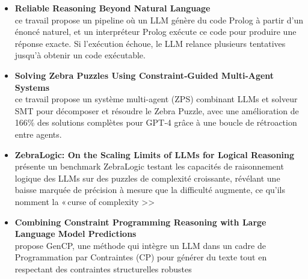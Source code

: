 \documentclass[a4paper,11pt]{article}
\begin{document}
\begin{itemize}
  \item \textbf{Reliable Reasoning Beyond Natural Language} \\
 ce travail propose un pipeline où un LLM génère du code Prolog à partir d’un énoncé naturel, et un interpréteur Prolog exécute ce code pour produire une réponse exacte. Si l’exécution échoue, le LLM relance plusieurs tentatives jusqu’à obtenir un code exécutable.

  \item \textbf{Solving Zebra Puzzles Using Constraint‑Guided Multi‑Agent Systems} \\
  ce travail propose un système multi-agent (ZPS) combinant LLMs et solveur SMT pour décomposer et résoudre le Zebra Puzzle, avec une amélioration de 166\% des solutions complètes pour GPT‑4 grâce à une boucle de rétroaction entre agents.

  \item \textbf{ZebraLogic: On the Scaling Limits of LLMs for Logical Reasoning} \\
   présente un benchmark ZebraLogic testant les capacités de raisonnement logique des LLMs sur des puzzles de complexité croissante, révélant une baisse marquée de précision à mesure que la difficulté augmente, ce qu’ils nomment la « curse of complexity >>

  \item \textbf{Combining Constraint Programming Reasoning with Large Language Model Predictions} \\
  propose GenCP, une méthode qui intègre un LLM dans un cadre de Programmation par Contraintes (CP) pour générer du texte tout en respectant des contraintes structurelles robustes 
\end{itemize}

  
\end{document}
